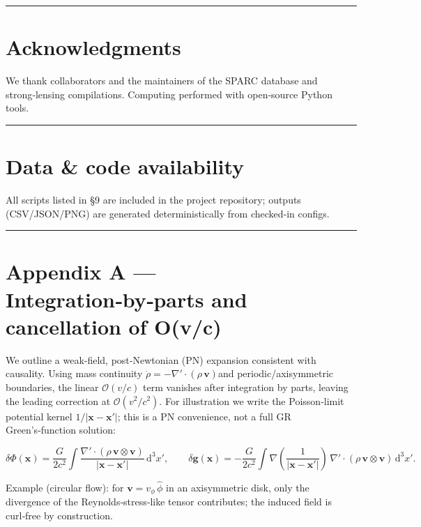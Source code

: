 \documentclass[11pt,a4paper]{article}
\begin{document}
\medskip\hrule\medskip


\section{Acknowledgments}


We thank collaborators and the maintainers of the SPARC database and strong‑lensing compilations. Computing performed with open‑source Python tools.


\medskip\hrule\medskip


\section{Data \& code availability}


All scripts listed in §9 are included in the project repository; outputs (CSV/JSON/PNG) are generated deterministically from checked‑in configs.


\medskip\hrule\medskip


\section{Appendix A — Integration‑by‑parts and cancellation of O(v/c)}


We outline a weak‑field, post‑Newtonian (PN) expansion consistent with causality. Using mass continuity $\allowbreak \dot\rho=-\nabla'\!\cdot(\rho\,\mathbf{v})$\allowbreak  and periodic/axisymmetric boundaries, the linear $\mathcal{O}(v/c)$ term vanishes after integration by parts, leaving the leading correction at $\mathcal{O}(v^2/c^2)$. For illustration we write the Poisson‑limit potential kernel $\allowbreak 1/\lvert \mathbf{x}-\mathbf{x}'\rvert$\allowbreak ; this is a PN convenience, not a full GR Green’s‑function solution:


\begin{equation}
\delta\Phi(\mathbf{x}) = \frac{G}{2c^2} \int \frac{\nabla'\!\cdot(\rho\,\mathbf{v}\!\otimes\!\mathbf{v})}{\lvert \mathbf{x}-\mathbf{x}'\rvert}\,\mathrm{d}^3\!x' ,\qquad
\delta\mathbf{g}(\mathbf{x}) = -\frac{G}{2c^2} \int \nabla\!\left(\frac{1}{\lvert \mathbf{x}-\mathbf{x}'\rvert}\right) \, \nabla'\!\cdot(\rho\,\mathbf{v}\!\otimes\!\mathbf{v})\,\mathrm{d}^3\!x' .
\end{equation}


Example (circular flow): for $\mathbf{v}=v_\phi\,\hat\phi$ in an axisymmetric disk, only the divergence of the Reynolds‑stress‑like tensor contributes; the induced field is curl‑free by construction.
\end{document}
